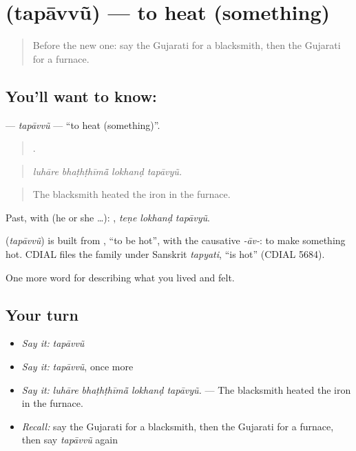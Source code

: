 \section[\texorpdfstring{\gu{તપાવવું} (tapāvvũ)}{તપાવવું (tapāvvũ)}]{ (tapāvvũ) — to heat (something)}

\label{lesson:GU-C508-tapavvu}



\begin{quote}
Before the new one: say the Gujarati for a blacksmith, then the Gujarati for a furnace.
\end{quote}

\subsection*{You'll want to know: }
\textbf{} — \emph{tapāvvũ} — \textquotedblleft{}to heat (something)\textquotedblright{}.

\begin{quote}
   .
\end{quote}

\begin{quote}
\emph{luhāre bhaṭhṭhīmā̃ lokhanḍ tapāvyũ.}
\end{quote}

\begin{quote}
The blacksmith heated the iron in the furnace.
\end{quote}

Past, with  (he or she …):   , \emph{teṇe lokhanḍ tapāvyũ}.

\begin{cousinweb}
\textbf{} (\emph{tapāvvũ}) is built from \textbf{}, \textquotedblleft{}to be hot\textquotedblright{}, with the causative \emph{-āv-}: to make something hot. CDIAL files the family under Sanskrit \emph{tapyati}, \textquotedblleft{}is hot\textquotedblright{} (CDIAL 5684).
\end{cousinweb}

\begin{grammarlens}[title={What you've built}]
One more word for describing what you lived and felt.
\end{grammarlens}

\subsection*{Your turn}
\begin{itemize}
\raggedright
  \item \emph{Say it:} \emph{tapāvvũ}
  \item \emph{Say it:} \emph{tapāvvũ}, once more
  \item \emph{Say it:} \emph{luhāre bhaṭhṭhīmā̃ lokhanḍ tapāvyũ.} — The blacksmith heated the iron in the furnace.
  \item \emph{Recall:} say the Gujarati for a blacksmith, then the Gujarati for a furnace, then say \emph{tapāvvũ} again
\end{itemize}

